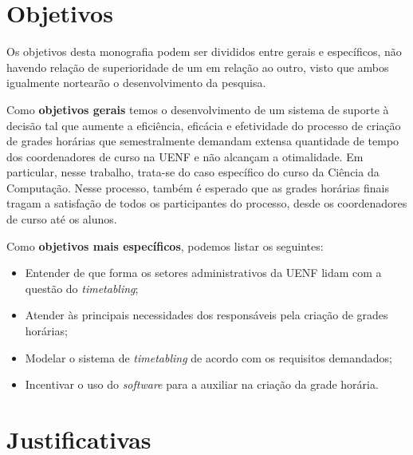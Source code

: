 \section{Objetivos} \label{sec:Objetivos}                %

Os objetivos desta monografia podem ser divididos entre gerais e específicos, não havendo relação de superioridade de um em relação ao outro, visto que ambos igualmente nortearão o desenvolvimento da pesquisa.


Como \textbf{objetivos gerais} temos o desenvolvimento de um sistema de suporte à decisão tal que aumente a eficiência, eficácia e efetividade do processo de criação de grades horárias que semestralmente demandam extensa quantidade de tempo dos coordenadores de curso na UENF e não alcançam a otimalidade. Em particular, nesse trabalho, trata-se do caso específico do curso da Ciência da Computação. Nesse processo, também é esperado que as grades horárias finais tragam a satisfação de todos os participantes do processo, desde os coordenadores de curso até os alunos.


Como \textbf{objetivos mais específicos}, podemos listar os seguintes:

\begin{itemize}
      \item Entender de que forma os setores administrativos da UENF lidam com a questão do \textit{timetabling};
      \item Atender às principais necessidades dos responsáveis pela criação de grades horárias;
      \item Modelar o sistema de \textit{timetabling} de acordo com os requisitos demandados;
      \item Incentivar o uso do \textit{software} para a auxiliar na criação da grade horária.
\end{itemize}

\section{Justificativas} \label{sec:Justificativas}      %

